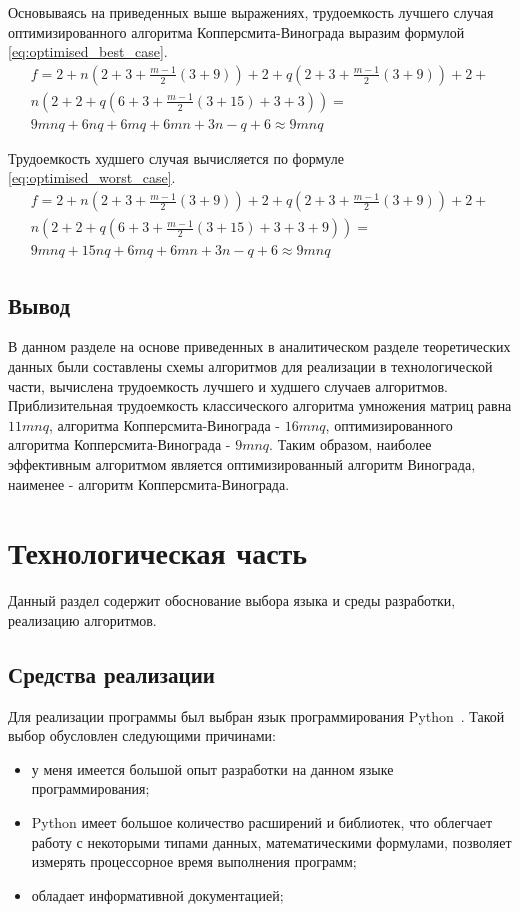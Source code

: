 \documentclass[a4paper,oneside,14pt]{extreport}
\begin{document}
Основываясь на приведенных выше выражениях, трудоемкость лучшего случая оптимизированного алгоритма Копперсмита-Винограда выразим формулой \ref{eq:optimised_best_case}.
\begin{equation} \label{eq:optimised_best_case}
\begin{array}{ll}
f = 2 + n(2 + 3 + \frac{m-1}{2}(3 + 9)) + 2 + q(2 + 3 + \frac{m-1}{2}(3 + 9)) + 2 + \\
n(2 + 2 + q(6 + 3 + \frac{m-1}{2}(3 + 15) + 3 + 3)) =\\
 9mnq + 6nq + 6mq + 6mn+3n-q+6 \approx 9mnq
\end{array}
\end{equation}

Трудоемкость худшего случая вычисляется по формуле \ref{eq:optimised_worst_case}.
\begin{equation} \label{eq:optimised_worst_case}
\begin{array}{ll}
f = 2 + n(2 + 3 + \frac{m-1}{2}(3 + 9)) + 2 + q(2 + 3 + \frac{m-1}{2}(3 + 9)) + 2 + \\
n(2 + 2 + q(6 + 3 + \frac{m-1}{2}(3 + 15) + 3 + 3 + 9)) = \\
9mnq+15nq+6mq+6mn+3n-q+6\approx 9mnq
\end{array}
\end{equation}

\section{Вывод}
В данном разделе на основе приведенных в аналитическом разделе теоретических данных были составлены схемы алгоритмов для реализации в технологической части, вычислена трудоемкость лучшего и худшего случаев алгоритмов. Приблизительная трудоемкость классического алгоритма умножения матриц равна $11mnq$, алгоритма Копперсмита-Винограда - $16mnq$, оптимизированного алгоритма Копперсмита-Винограда - $9mnq$. Таким образом, наиболее эффективным алгоритмом является оптимизированный алгоритм Винограда, наименее - алгоритм Копперсмита-Винограда.
\newpage

\chapter{Технологическая часть}
Данный раздел содержит обоснование выбора языка и среды разработки, реализацию алгоритмов.

\section{Средства реализации}
Для реализации программы был выбран язык программирования Python~\cite{python}. Такой выбор обусловлен следующими причинами:
\begin{itemize}
	\item у меня имеется большой опыт разработки на данном языке программирования;
	\item Python имеет большое количество расширений и библиотек, что облегчает работу с некоторыми типами данных, математическими формулами, позволяет измерять процессорное время выполнения программ;
	\item обладает информативной документацией;
\end{itemize}
\end{document}
